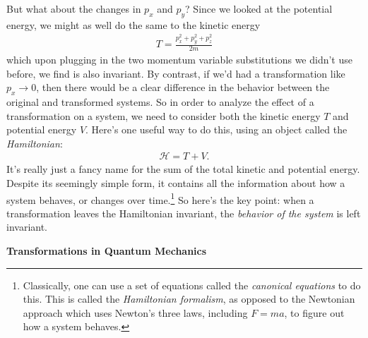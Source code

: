 But what about the changes in $p_x$ and $p_y$? Since we looked at the potential energy, we might as well do the same to the kinetic energy
\begin{align*}
    T = \frac{p_x^2 + p_y^2 + p_z^2}{2m}
\end{align*}
which upon plugging in the two momentum variable substitutions we didn't use before, we find is also invariant. By contrast, if we'd had a transformation like $p_x \rightarrow 0$, then there would be a clear difference in the behavior between the original and transformed systems. So in order to analyze the effect of a transformation on a system, we need to consider both the kinetic energy $T$ and potential energy $V$. Here's one useful way to do this, using an object called the \emph{Hamiltonian}:
\begin{align*}
    \mathscr{H} = T + V.
\end{align*}
It's really just a fancy name for the sum of the total kinetic and potential energy. Despite its seemingly simple form, it contains all the information about how a system behaves, or changes over time.\footnote{Classically, one can use a set of equations called the \emph{canonical equations} to do this. This is called the \emph{Hamiltonian formalism}, as opposed to the Newtonian approach which uses Newton's three laws, including $F = ma$, to figure out how a system behaves.} So here's the key point: when a transformation leaves the Hamiltonian invariant, the \emph{behavior of the system} is left invariant.

\noindent
\textbf{Transformations in Quantum Mechanics}

